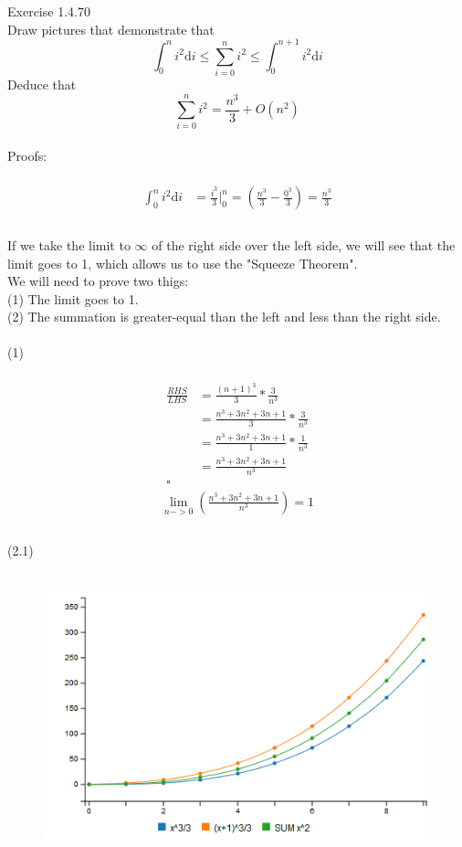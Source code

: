 \documentclass{article}
\begin{document}
	Exercise 1.4.70\\
	Draw pictures that demonstrate that
	$$ \int_{0}^{n}{i^2\mathrm{d}i} \le \sum_{i=0}^{n}{i^2} \le \int_{0}^{n+1}{i^2\mathrm{d}i} $$
	Deduce that
	$$ \sum_{i=0}^{n}{i^2}=\frac{n^3}{3} + O(n^2) $$
	\\
	Proofs:\\
	\\
	\begin{align*}
		\int_{0}^{n}{i^2\mathrm{d}i} &= \frac{i^3}{3}\Big|_0^n = (\frac{n^3}{3}-\frac{0^3}{3}) = \frac{n^3}{3}\\
	\end{align*}	
	\\
	If we take the limit to $\infty$ of the right side over the left side, we will see that the limit goes to 1, which allows us to use the "Squeeze Theorem".\\
	We will need to prove two thigs:\\
	(1) The limit goes to 1.\\
	(2) The summation is greater-equal than the left and less than the right side.\\
	\pagebreak
	\\
	(1)\\
	\\
	\begin{align*}
		\frac{RHS}{LHS} &= \frac{(n+1)^3}{3}*\frac{3}{n^3}\\
		&=\frac{n^{3} + 3n^{2} + 3n + 1}{3}*\frac{3}{n^3}\\
		&=\frac{n^{3} + 3n^{2} + 3n + 1}{1}*\frac{1}{n^3}\\
		&=\frac{n^{3} + 3n^{2} + 3n + 1}{n^3}\\
		\square
	\end{align*}
	\begin{align*}
		\lim_{n->0}{(\frac{n^{3} + 3n^{2} + 3n + 1}{n^3})} = 1\\
	\end{align*}
	\pagebreak
	\\
	(2.1)\\
	\\
	\begin{figure}
		\centering
		\includegraphics{104070}
		\caption{}
		\label{fig:104070}
	\end{figure}\\
\end{document}
